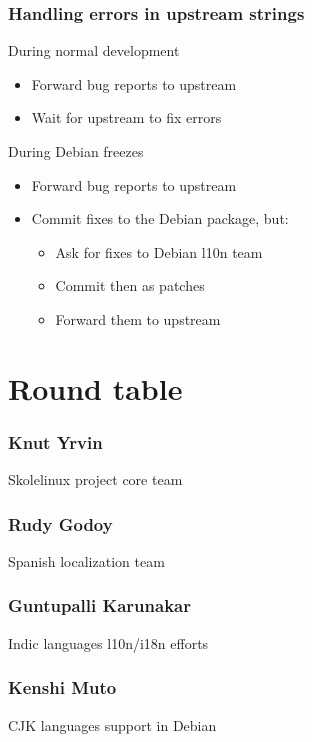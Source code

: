 \documentclass{beamer}
\begin{document}
\begin{frame}
  \frametitle{Handling errors in upstream strings}
	\begin{block}
		{During normal development}
		\begin{itemize}
		\item
			Forward bug reports to upstream
		\item
			Wait for upstream to fix errors
		\end{itemize}
	\end{block}
	\begin{block}
		{During Debian freezes}
		\begin{itemize}
		\item
			Forward bug reports to upstream
		\item
			Commit fixes to the Debian package, but:
			\begin{itemize}
			\item
				Ask for fixes to Debian l10n team
			\item
				Commit then as patches
			\item
				Forward them to upstream
			\end{itemize}
		\end{itemize}
	\end{block}
\end{frame}

\section{Round table}

\begin{frame}
  \frametitle{Knut Yrvin}
	\begin{block}
		{Skolelinux project core team}
	\end{block}
\end{frame}

\begin{frame}
  \frametitle{Rudy Godoy}
	\begin{block}
		{Spanish localization team}
	\end{block}
\end{frame}

\begin{frame}
  \frametitle{Guntupalli Karunakar}
	\begin{block}
		{Indic languages l10n/i18n efforts}
	\end{block}
\end{frame}

\begin{frame}
  \frametitle{Kenshi Muto}
	\begin{block}
		{CJK languages support in Debian}
	\end{block}
\end{frame}
\end{document}
